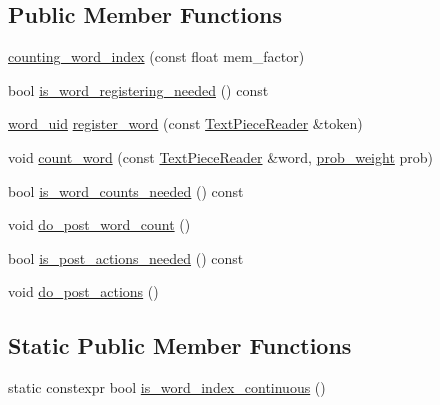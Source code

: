 \subsection*{Public Member Functions}
\begin{DoxyCompactItemize}
\item 
\hyperlink{classuva_1_1smt_1_1bpbd_1_1server_1_1lm_1_1dictionary_1_1counting__word__index_a45cc59a8b01a6969185abfe64e431f40}{counting\+\_\+word\+\_\+index} (const float mem\+\_\+factor)
\item 
bool \hyperlink{classuva_1_1smt_1_1bpbd_1_1server_1_1lm_1_1dictionary_1_1counting__word__index_a7b530630b019f9f9546ac2acf38d0d8b}{is\+\_\+word\+\_\+registering\+\_\+needed} () const 
\item 
\hyperlink{namespaceuva_1_1smt_1_1bpbd_1_1server_a6bfe45ba344d65a7fdd7d26156328ddc}{word\+\_\+uid} \hyperlink{classuva_1_1smt_1_1bpbd_1_1server_1_1lm_1_1dictionary_1_1counting__word__index_ae6ba2913927b35d6949d9dff11997a69}{register\+\_\+word} (const \hyperlink{classuva_1_1utils_1_1file_1_1_text_piece_reader}{Text\+Piece\+Reader} \&token)
\item 
void \hyperlink{classuva_1_1smt_1_1bpbd_1_1server_1_1lm_1_1dictionary_1_1counting__word__index_aed4802f9e0790e8cbf007eea63acab5e}{count\+\_\+word} (const \hyperlink{classuva_1_1utils_1_1file_1_1_text_piece_reader}{Text\+Piece\+Reader} \&word, \hyperlink{namespaceuva_1_1smt_1_1bpbd_1_1server_a01e9ea4de9c226f4464862e84ff0bbcc}{prob\+\_\+weight} prob)
\item 
bool \hyperlink{classuva_1_1smt_1_1bpbd_1_1server_1_1lm_1_1dictionary_1_1counting__word__index_a63889a048a4d71116c526fbf89f47fad}{is\+\_\+word\+\_\+counts\+\_\+needed} () const 
\item 
void \hyperlink{classuva_1_1smt_1_1bpbd_1_1server_1_1lm_1_1dictionary_1_1counting__word__index_a84cdef8ee880690c644b122bec2bc8d2}{do\+\_\+post\+\_\+word\+\_\+count} ()
\item 
bool \hyperlink{classuva_1_1smt_1_1bpbd_1_1server_1_1lm_1_1dictionary_1_1counting__word__index_ab89430f0d54c6de70b693386c1966a40}{is\+\_\+post\+\_\+actions\+\_\+needed} () const 
\item 
void \hyperlink{classuva_1_1smt_1_1bpbd_1_1server_1_1lm_1_1dictionary_1_1counting__word__index_a104d6e256540a23db472fe7de0f9bf5f}{do\+\_\+post\+\_\+actions} ()
\end{DoxyCompactItemize}
\subsection*{Static Public Member Functions}
\begin{DoxyCompactItemize}
\item 
static constexpr bool \hyperlink{classuva_1_1smt_1_1bpbd_1_1server_1_1lm_1_1dictionary_1_1counting__word__index_aa8ec0139749382322a9955bf645b00e6}{is\+\_\+word\+\_\+index\+\_\+continuous} ()
\end{DoxyCompactItemize}
